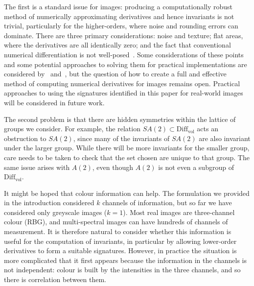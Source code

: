 \documentclass{artjlt}
\begin{document}
The first is a standard issue for images: producing a computationally robust method of numerically approximating derivatives and hence invariants is not trivial, particularly for the higher-orders, where noise and rounding errors can dominate. There are three primary considerations: noise and texture; flat areas, where the derivatives are all identically zero; and the fact that conventional numerical differentiation is not well-posed~\citep{Florack1993}. Some considerations of these points and some potential approaches to solving them for practical implementations are considered by~\citet{Calabi1998} and~\citet{Florack1993}, but the question of how to create a full and effective method of computing numerical derivatives for images remains open. Practical approaches to using the signatures identified in this paper for real-world images will be considered in future work.

The second problem is that there are hidden symmetries within the lattice of groups we consider. For example, the relation $SA(2)\subset \mathrm{Diff}_{\mathrm{vol}}$ acts an obstruction to $SA(2)$, since many of the invariants of $SA(2)$ are also invariant under the larger group. While there will be more invariants for the smaller group, care needs to be taken to check that the set chosen are unique to that group. The same issue arises with $A(2)$, even though $A(2)$ is not even a subgroup of $\mathrm{Diff}_{\mathrm{vol}}$.

It might be hoped that colour information can help. The formulation we provided in the introduction considered $k$ channels of information, but so far we have considered only greyscale images ($k=1$). Most real images are three-channel colour (RBG), and multi-spectral images can have hundreds of channels of measurement. It is therefore natural to consider whether this information is useful for the computation of invariants, in particular by allowing lower-order derivatives to form a suitable signatures. However, in practice the situation is more complicated that it first appears because the information in the channels is not independent: colour is built by the intensities in the three channels, and so there is correlation between them. %
\end{document}
